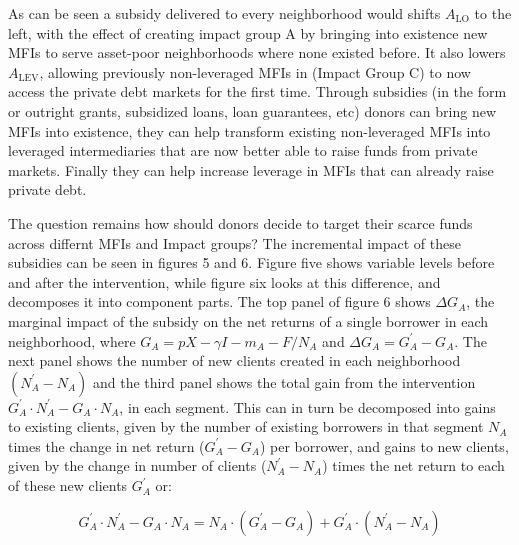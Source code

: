 \documentclass[letterpaper, 12pt]{article}
\begin{document}
As can be seen a subsidy delivered to every neighborhood would shifts
\(A_{\text{LO}}\) to the left, with the effect of creating impact group
A by bringing into existence new MFIs to serve asset-poor neighborhoods
where none existed before. It also lowers \(A_{\text{LEV}}\), allowing
previously non-leveraged MFIs in (Impact Group C) to now access the
private debt markets for the first time. Through subsidies (in the form
or outright grants, subsidized loans, loan guarantees, etc) donors can
bring new MFIs into existence, they can help transform existing
non-leveraged MFIs into leveraged intermediaries that are now better
able to raise funds from private markets. Finally they can help increase
leverage in MFIs that can already raise private debt.

The question remains how should donors decide to target their scarce
funds across differnt MFIs and Impact groups? The incremental impact of
these subsidies can be seen in figures 5 and 6. Figure five shows
variable levels before and after the intervention, while figure six
looks at this difference, and decomposes it into component parts. The
top panel of figure 6 shows \(\Delta G_{A}\), the marginal impact of the
subsidy on the net returns of a single borrower in each neighborhood,
where \(G_{A} = pX - \gamma I - m_{A} - F/N_{A}\) and
\(\Delta G_{A} = G_{A}^{'} - G_{A}.\) The next panel shows the number of
new clients created in each neighborhood \((N_{A}^{'} - N_{A})\) and the
third panel shows the total gain from the intervention
\(G_{A}^{'} \cdot N_{A}^{'} - G_{A} \cdot N_{A}\), in each segment. This
can in turn be decomposed into gains to existing clients, given by the
number of existing borrowers in that segment \(N_{A}\) times the change
in net return (\(G_{A}^{'} - G_{A}\)) per borrower, and gains to new
clients, given by the change in number of clients
(\(N_{A}^{'} - N_{A}\)) times the net return to each of these new
clients \(G_{A}^{'}\) or:

\[{G_{A}^{'} \cdot N_{A}^{'} - G_{A} \cdot N_{A}
}{= N_{A} \cdot (G_{A}^{'} - G_{A}) + G_{A}^{'} \cdot (N_{A}^{'} - N_{A})}\]
\end{document}
